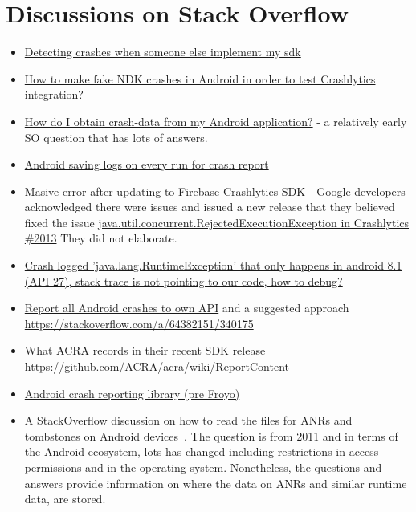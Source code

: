 \section{Discussions on Stack Overflow}
\begin{itemize}
    \item \href{https://stackoverflow.com/questions/66471628/detecting-crashes-when-someone-else-implement-my-sdk}{Detecting crashes when someone else implement my sdk}
    \item \href{https://stackoverflow.com/questions/67138663/how-to-make-fake-ndk-crashes-in-android-in-order-to-test-crashlytics-integration}{How to make fake NDK crashes in Android in order to test Crashlytics integration?}
    \item \href{How do I obtain crash-data from my Android application?}{How do I obtain crash-data from my Android application?} - a relatively early SO question that has lots of answers.
    \item \href{https://stackoverflow.com/questions/20763011/android-saving-logs-on-every-run-for-crash-report}{Android saving logs on every run for crash report}
    \item \href{https://stackoverflow.com/questions/63190868/masive-error-after-updating-to-firebase-crashlytics-sdk}{Masive error after updating to Firebase Crashlytics SDK} - Google developers acknowledged there were issues and issued a new release that they believed fixed the issue \href{https://github.com/firebase/firebase-android-sdk/issues/2013}{java.util.concurrent.RejectedExecutionException in Crashlytics \#2013} They did not elaborate.
    \item \href{https://stackoverflow.com/questions/64381093/crash-logged-java-lang-runtimeexception-that-only-happens-in-android-8-1-api}{Crash logged 'java.lang.RuntimeException' that only happens in android 8.1 (API 27), stack trace is not pointing to our code, how to debug?}
    \item \href{https://stackoverflow.com/questions/59926756/report-all-android-crashes-to-own-api}{Report all Android crashes to own API} and a suggested approach \url{https://stackoverflow.com/a/64382151/340175}
    \item What ACRA records in their recent SDK release \url{https://github.com/ACRA/acra/wiki/ReportContent}
    \item \href{https://stackoverflow.com/questions/3378550/android-crash-reporting-library-pre-froyo}{Android crash reporting library (pre Froyo)}
    \item A StackOverflow discussion on how to read the files for ANRs and tombstones on Android devices~\citep{learner2011_so_how_to_access_anrs_and_tombstones}. The question is from 2011 and in terms of the Android ecosystem, lots has changed including restrictions in access permissions and in the operating system. Nonetheless, the questions and answers provide information on where the data on ANRs and similar runtime data, are stored.

\end{itemize}

